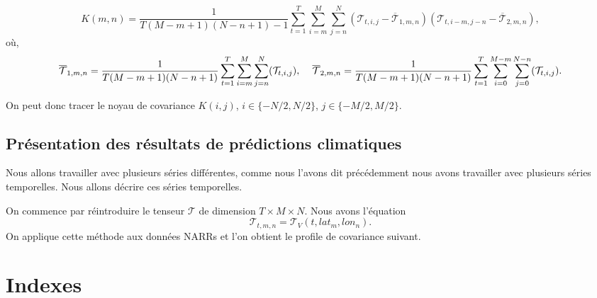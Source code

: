 \documentclass[a4paper,10pt]{article}
\begin{document}
\[K(m,n)=\frac{1}{T(M-m+1)(N-n+1)-1}\sum_{t=1}^{T}\sum_{i=m}^{M}\sum_{j=n}^{N}(\mathcal{T}_{t,i,j}-\overline{\mathcal{T}}_{1,m,n})(\mathcal{T}_{t,i-m,j-n}-\overline{\mathcal{T}}_{2,m,n}),\]
où,
\[\overline{\mathcal{T}}_{1,m,n}=\frac{1}{T(M-m+1)(N-n+1)}\sum_{t=1}^{T}\sum_{i=m}^{M}\sum_{j=n}^{N}(\mathcal{T}_{t,i,j}), \hspace{4mm}\overline{\mathcal{T}}_{2,m,n}=\frac{1}{T(M-m+1)(N-n+1)}\sum_{t=1}^{T}\sum_{i=0}^{M-m}\sum_{j=0}^{N-n}(\mathcal{T}_{t,i,j}).\]

On peut donc tracer le noyau de covariance $K(i,j)$, $i \in\{-N/2,N/2\}$, $j \in \{-M/2,M/2\}$. 


\subsection{Présentation des résultats de prédictions climatiques}

Nous allons travailler avec plusieurs séries différentes, comme nous l'avons dit précédemment nous avons travailler avec plusieurs séries temporelles. Nous allons décrire ces séries temporelles.

On commence par réintroduire le tenseur $\mathcal{T}$ de dimension $T \times M\times N$. Nous avons l'équation 
\[\mathcal{T}_{t,m,n}=\mathcal{T}_V(t,lat_m,lon_n).\]
On applique cette méthode aux données NARRs et l'on obtient le profile de covariance suivant.



\section{Indexes}
\end{document}
